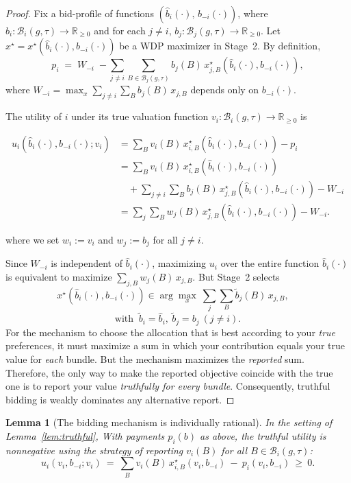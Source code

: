 \documentclass[letterpaper]{article}
\newtheorem{lemma}{Lemma}
\begin{document}
\begin{proof}[Proof]
Fix a bid-profile of functions $(\hat b_i(\cdot),\, b_{-i}(\cdot))$, where
$\hat b_i:\mathcal{B}_i(g,\tau)\!\to\!\mathbb{R}_{\ge0}$ and
for each $j\neq i$, $b_j:\mathcal{B}_j(g,\tau)\!\to\!\mathbb{R}_{\ge0}$.
Let $x^\star=x^\star(\hat b_i(\cdot),b_{-i}(\cdot))$ be a WDP maximizer in Stage~2.
By definition,
\[
p_i \;=\; W_{-i}\;-\!\!\sum_{j\neq i}\sum_{B\in\mathcal{B}_j(g,\tau)} b_j(B)\,x^\star_{j,B}(\hat b_i(\cdot),b_{-i}(\cdot)),
\]
where $W_{-i}=\max_{x}\sum_{j\neq i}\sum_{B} b_j(B)\,x_{j,B}$ depends only on $b_{-i}(\cdot)$.

The utility of $i$ under its true valuation function $v_i:\mathcal{B}_i(g,\tau)\!\to\!\mathbb{R}_{\ge0}$ is

\begin{align*}
u_i(\hat b_i(\cdot),b_{-i}(\cdot);v_i)
&= \sum_{B} v_i(B)\,
   x^\star_{i,B}(\hat b_i(\cdot),b_{-i}(\cdot)) - p_i\\
&= \sum_{B} v_i(B)\,
   x^\star_{i,B}(\hat b_i(\cdot),b_{-i}(\cdot))\\
&\quad+ \sum_{j\neq i}\sum_{B} b_j(B)\,
   x^\star_{j,B}(\hat b_i(\cdot),b_{-i}(\cdot))
   - W_{-i}\\
&= \sum_{j}\sum_{B} w_j(B)\,
   x^\star_{j,B}(\hat b_i(\cdot),b_{-i}(\cdot)) - W_{-i}.
\end{align*}

where we set $w_i:=v_i$ and $w_j:=b_j$ for all $j\neq i$.

Since $W_{-i}$ is independent of $\hat b_i(\cdot)$, maximizing $u_i$ over the entire function $\hat b_i(\cdot)$
is equivalent to maximize $\sum_{j,B} w_j(B)\,x_{j,B}$.
But Stage~2 selects
\[
x^\star(\hat b_i(\cdot),b_{-i}(\cdot))\in\arg\max_{x}\ \sum_{j}\sum_{B} \tilde b_j(B)\,x_{j,B},
\quad
\]
\[
\text{with }\ \tilde b_i=\hat b_i,\ \tilde b_j=b_j\ (j\neq i).
\]
For the mechanism to choose the allocation that is best
according to your \emph{true} preferences, it must maximize a sum in which
your contribution equals your true value for \emph{each} bundle. But the
mechanism maximizes the \emph{reported} sum. Therefore, the only way to make
the reported objective coincide with the true one is to report your value
\emph{truthfully for every bundle}.
Consequently, truthful bidding is weakly dominates any alternative report.
\qedhere
\end{proof}



\begin{lemma}[The bidding mechanism is individually rational]\label{lem:IR-bids}
In the setting of Lemma~\ref{lem:truthful}, With payments $p_i(b)$ as above, the truthful utility is nonnegative using the strategy of reporting $v_i(B)$ for all $B\in\mathcal{B}_i(g,\tau)$:
\[
u_i(v_i,b_{-i};v_i)\ =\ \sum_{B} v_i(B)\,x^\star_{i,B}(v_i,b_{-i})\ -\ p_i(v_i,b_{-i})\ \ge\ 0.
\]
\end{lemma}
\end{document}
